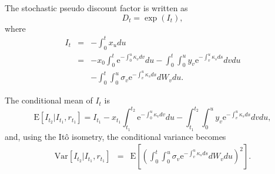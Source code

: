 \documentclass{report}
\newcommand{\E}{\mathrm{E}}
\newcommand{\Var}{\mathrm{Var}}
\newcommand{\e}{\text{e}}
\begin{document}
The stochastic pseudo discount factor is written as
\begin{equation}
D_{t} = \exp \left( I_t \right),
\end{equation}
where
\begin{eqnarray}
I_t &=& -\int_0^t x_u du \\
&=& - x_{0} \int_0^t \e^{-\int_{0}^{u} \kappa_v dv} du - \int_0^t\int_{0}^{u} y_v \e^{-\int_v^{u} \kappa_s ds} dv du \\
&& - \int_0^t \int_{0}^{u} \sigma_v \e^{-\int_v^{u} \kappa_s ds} dW_v du.
\end{eqnarray}

The conditional mean of $I_t$ is
\begin{equation}
\E \left[ I_{t_{2}} | I_{t_1}, r_{t_1} \right] = I_{t_1} - x_{t_1} \int_{t_1}^{t_2} \e^{-\int_{0}^{u} \kappa_v dv} du - \int_{t_1}^{t_2} \int_{0}^{u} y_v \e^{-\int_v^{u} \kappa_s ds} dv du,
\end{equation}
and, using the It\^{o} isometry, the conditional variance becomes
\begin{eqnarray}
\Var \left[ I_{t_{2}} | I_{t_1}, r_{t_1} \right] &=& \E \left[ \left( \int_0^t \int_{0}^{u} \sigma_v \e^{-\int_v^{u} \kappa_s ds} dW_v du \right)^2 \right].
\end{eqnarray}


 
\end{document}
